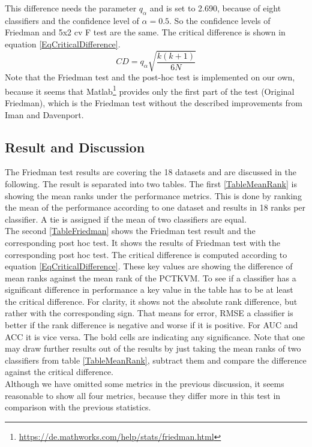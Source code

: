 This difference needs the parameter $q_\alpha$ and is set to 2.690, because of eight classifiers and the confidence level of $\alpha = 0.5$.
So the confidence levels of Friedman and 5x2 cv F test are the same.
The critical difference is shown in equation \eqref{EqCriticalDifference}.\cite[p. 11-12]{JanezDemsar.2006}
\begin{equation}\label{EqCriticalDifference}
	CD = q_\alpha\sqrt{\frac{k(k+1)}{6N}}
\end{equation}
Note that the Friedman test and the post-hoc test is implemented on our own, because it seems that Matlab\footnote{\url{https://de.mathworks.com/help/stats/friedman.html}} provides only the first part of the test (Original Friedman), which is the Friedman test without the described improvements from Iman and Davenport.

\subsection{Result and Discussion}\label{EmSubSecResMulDa}
The Friedman test results are covering the 18 datasets and are discussed in the following.
The result is separated into two tables.
The first \ref{TableMeanRank} is showing the mean ranks under the performance metrics.
This is done by ranking the mean of the performance according to one dataset and results in 18 ranks per classifier. A tie is assigned if the mean of two classifiers are equal.\\
The second \ref{TableFriedman} shows the Friedman test result and the corresponding post hoc test. 
It shows the results of Friedman test with the corresponding post hoc test. The critical difference is computed according to equation \eqref{EqCriticalDifference}.
These key values are showing the difference of mean ranks against the mean rank of the \acs{PCTKVM}.
To see if a classifier has a significant difference in performance a key value in the table has to be at least the critical difference.
For clarity, it shows not the absolute rank difference, but rather with the corresponding sign.
That means for error, \acs{RMSE} a classifier is better if the rank difference is negative and worse if it is positive.
For \acs{AUC} and \acs{ACC} it is vice versa.
The bold cells are indicating any significance.
Note that one may draw further results out of the results by just taking the mean ranks of two classifiers from table \ref{TableMeanRank}, subtract them and compare the difference against the critical difference. \\
Although we have omitted some metrics in the previous discussion, it seems reasonable to show all four metrics, because they differ more in this test in comparison with the previous statistics.
